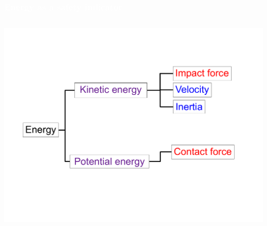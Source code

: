 \begin{frame}[noframenumbering]
\frametitle{{\textcolor{white}{Energy as a safety indicator}}}

\begin{columns}
\column{.95\paperwidth}

\begin{center}                
\includegraphics[width=1\textwidth ]{figures/fin07.pdf}
\end{center}       

\end{columns}

\end{frame}






